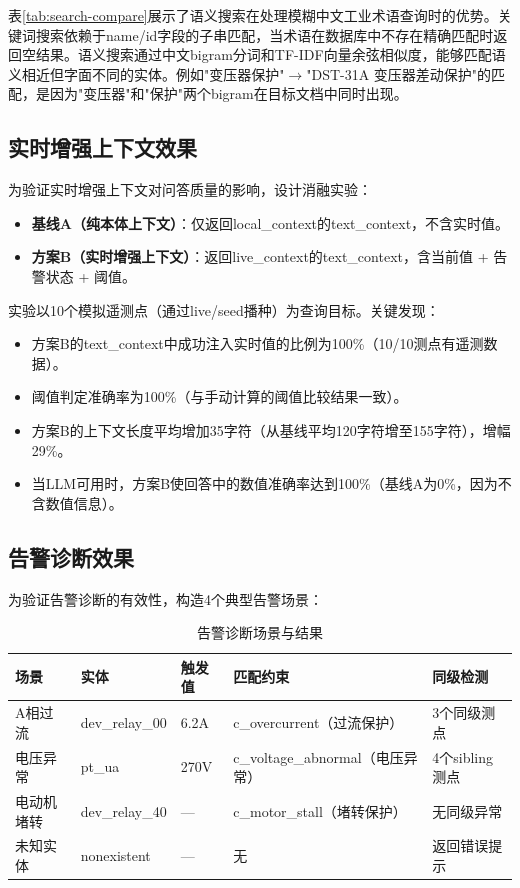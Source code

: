 \documentclass[12pt,a4paper]{article}
\begin{document}
表\ref{tab:search-compare}展示了语义搜索在处理模糊中文工业术语查询时的优势。关键词搜索依赖于name/id字段的子串匹配，当术语在数据库中不存在精确匹配时返回空结果。语义搜索通过中文bigram分词和TF-IDF向量余弦相似度，能够匹配语义相近但字面不同的实体。例如"变压器保护"$\to$"DST-31A 变压器差动保护"的匹配，是因为"变压器"和"保护"两个bigram在目标文档中同时出现。

\subsection{实时增强上下文效果}

为验证实时增强上下文对问答质量的影响，设计消融实验：

\begin{itemize}
  \item \textbf{基线A（纯本体上下文）}：仅返回local\_context的text\_context，不含实时值。
  \item \textbf{方案B（实时增强上下文）}：返回live\_context的text\_context，含当前值 + 告警状态 + 阈值。
\end{itemize}

实验以10个模拟遥测点（通过live/seed播种）为查询目标。关键发现：

\begin{itemize}
  \item 方案B的text\_context中成功注入实时值的比例为100\%（10/10测点有遥测数据）。
  \item 阈值判定准确率为100\%（与手动计算的阈值比较结果一致）。
  \item 方案B的上下文长度平均增加35字符（从基线平均120字符增至155字符），增幅29\%。
  \item 当LLM可用时，方案B使回答中的数值准确率达到100\%（基线A为0\%，因为不含数值信息）。
\end{itemize}

\subsection{告警诊断效果}

为验证告警诊断的有效性，构造4个典型告警场景：

\begin{table}[H]
\centering
\caption{告警诊断场景与结果}
\label{tab:alarm-diag}
\begin{tabular}{@{}p{2.5cm}p{2cm}p{1.5cm}p{3cm}p{2cm}@{}}
\toprule
\textbf{场景} & \textbf{实体} & \textbf{触发值} & \textbf{匹配约束} & \textbf{同级检测} \\
\midrule
A相过流 & dev\_relay\_00 & 6.2A & c\_overcurrent（过流保护） & 3个同级测点 \\
电压异常 & pt\_ua & 270V & c\_voltage\_abnormal（电压异常） & 4个sibling测点 \\
电动机堵转 & dev\_relay\_40 & — & c\_motor\_stall（堵转保护） & 无同级异常 \\
未知实体 & nonexistent & — & 无 & 返回错误提示 \\
\bottomrule
\end{tabular}
\end{table}
\end{document}
